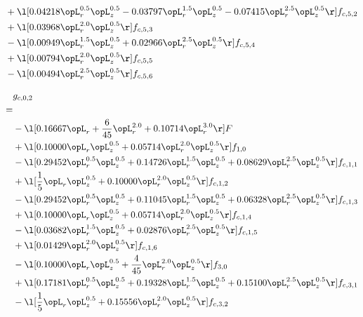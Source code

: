 \begin{alignat}{2}
& + \l[  0.04218 \opL_r^{0.5} \opL_z^{0.5}   -0.03797 \opL_r^{1.5} \opL_z^{0.5}   -0.07415 \opL_r^{2.5} \opL_z^{0.5}  \r] f_{c,5,2} \nonumber \\ 
& + \l[  0.03968 \opL_r^{2.0} \opL_z^{0.5}  \r] f_{c,5,3} \nonumber \\ 
& - \l[  0.00949 \opL_r^{1.5} \opL_z^{0.5} +  0.02966 \opL_r^{2.5} \opL_z^{0.5}  \r] f_{c,5,4} \nonumber \\ 
& + \l[  0.00794 \opL_r^{2.0} \opL_z^{0.5}  \r] f_{c,5,5} \nonumber \\ 
& - \l[  0.00494 \opL_r^{2.5} \opL_z^{0.5}  \r] f_{c,5,6} \nonumber \\ 
\end{alignat} 


\begin{alignat}{2} 
\label{eq:g_02_0} 
& g_{c,0,2} \nonumber \\ 
 = \\ 
& - \l[  0.16667 \opL_r + \frac{6}{45} \opL_r^{2.0} +  0.10714 \opL_r^{3.0}  \r] F \nonumber \\ 
& + \l[  0.10000 \opL_r \opL_z^{0.5} +  0.05714 \opL_r^{2.0} \opL_z^{0.5}  \r] f_{1,0} \nonumber \\ 
& - \l[  0.29452 \opL_r^{0.5} \opL_z^{0.5} +  0.14726 \opL_r^{1.5} \opL_z^{0.5} +  0.08629 \opL_r^{2.5} \opL_z^{0.5}  \r] f_{c,1,1} \nonumber \\ 
& + \l[ \frac{1}{5} \opL_r \opL_z^{0.5} +  0.10000 \opL_r^{2.0} \opL_z^{0.5}  \r] f_{c,1,2} \nonumber \\ 
& - \l[  0.29452 \opL_r^{0.5} \opL_z^{0.5} +  0.11045 \opL_r^{1.5} \opL_z^{0.5} +  0.06328 \opL_r^{2.5} \opL_z^{0.5}  \r] f_{c,1,3} \nonumber \\ 
& + \l[  0.10000 \opL_r \opL_z^{0.5} +  0.05714 \opL_r^{2.0} \opL_z^{0.5}  \r] f_{c,1,4} \nonumber \\ 
& - \l[  0.03682 \opL_r^{1.5} \opL_z^{0.5} +  0.02876 \opL_r^{2.5} \opL_z^{0.5}  \r] f_{c,1,5} \nonumber \\ 
& + \l[  0.01429 \opL_r^{2.0} \opL_z^{0.5}  \r] f_{c,1,6} \nonumber \\ 
& - \l[  0.10000 \opL_r \opL_z^{0.5} + \frac{4}{45} \opL_r^{2.0} \opL_z^{0.5}  \r] f_{3,0} \nonumber \\ 
& + \l[  0.17181 \opL_r^{0.5} \opL_z^{0.5} +  0.19328 \opL_r^{1.5} \opL_z^{0.5} +  0.15100 \opL_r^{2.5} \opL_z^{0.5}  \r] f_{c,3,1} \nonumber \\ 
& - \l[ \frac{1}{5} \opL_r \opL_z^{0.5} +  0.15556 \opL_r^{2.0} \opL_z^{0.5}  \r] f_{c,3,2} \nonumber \\ 

\end{alignat}
